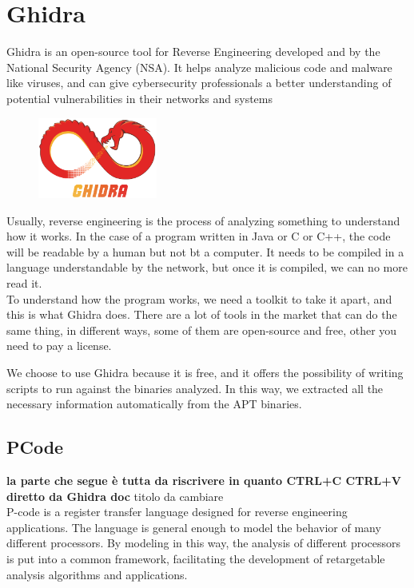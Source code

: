 \section{Ghidra}
Ghidra is an open-source tool for Reverse Engineering developed and by the National Security Agency (NSA). It helps analyze malicious code and malware like viruses, and can give cybersecurity professionals a better understanding of potential vulnerabilities in their networks and systems \cite{ghidra}
\begin{figure}
	\centering
	\includegraphics[width=0.35\textwidth]{ghidra}
	
\end{figure}


Usually, reverse engineering is the process of analyzing something to understand how it works. In the case of a program written in Java or C or C++, the code will be readable by a human but not bt a computer. It needs to be compiled in a language understandable by the network, but once it is compiled, we can no more read it. \\

To understand how the program works, we need a toolkit to take it apart, and this is what Ghidra does. There are a lot of tools in the market that can do the same thing, in different ways, some of them are open-source and free, other you need to pay a license. 

We choose to use Ghidra because it is free, and it offers the possibility of writing scripts to run against the binaries analyzed. In this way, we extracted all the necessary information automatically from the APT binaries.

\subsection{PCode}
\textbf{la parte che segue è tutta da riscrivere in quanto CTRL+C CTRL+V diretto da Ghidra doc} \cite{ghidra_pcode}
titolo da cambiare\\

P-code is a register transfer language designed for reverse engineering applications. The language is general enough to model the behavior of many different processors. By modeling in this way, the analysis of different processors is put into a common framework, facilitating the development of retargetable analysis algorithms and applications.

